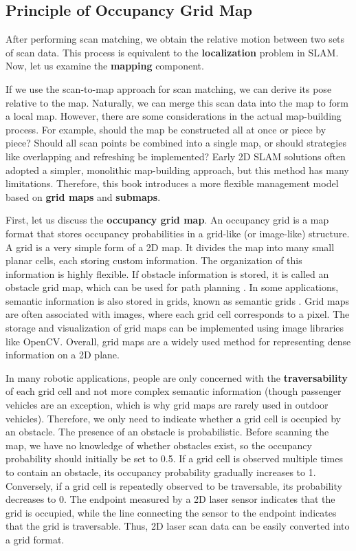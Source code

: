 \subsection{Principle of Occupancy Grid Map}  
After performing scan matching, we obtain the relative motion between two sets of scan data. This process is equivalent to the \textbf{localization} problem in SLAM. Now, let us examine the \textbf{mapping} component.  

If we use the scan-to-map approach for scan matching, we can derive its pose relative to the map. Naturally, we can merge this scan data into the map to form a local map. However, there are some considerations in the actual map-building process. For example, should the map be constructed all at once or piece by piece? Should all scan points be combined into a single map, or should strategies like overlapping and refreshing be implemented? Early 2D SLAM solutions often adopted a simpler, monolithic map-building approach, but this method has many limitations. Therefore, this book introduces a more flexible management model based on \textbf{grid maps} and \textbf{submaps}.  

First, let us discuss the \textbf{occupancy grid map}. An occupancy grid is a map format that stores occupancy probabilities in a grid-like (or image-like) structure. A grid is a very simple form of a 2D map. It divides the map into many small planar cells, each storing custom information. The organization of this information is highly flexible. If obstacle information is stored, it is called an obstacle grid map, which can be used for path planning \cite{Tsardoulias2016}. In some applications, semantic information is also stored in grids, known as semantic grids \cite{Qi2020}. Grid maps are often associated with images, where each grid cell corresponds to a pixel. The storage and visualization of grid maps can be implemented using image libraries like OpenCV. Overall, grid maps are a widely used method for representing dense information on a 2D plane.  

In many robotic applications, people are only concerned with the \textbf{traversability} of each grid cell and not more complex semantic information (though passenger vehicles are an exception, which is why grid maps are rarely used in outdoor vehicles). Therefore, we only need to indicate whether a grid cell is occupied by an obstacle. The presence of an obstacle is probabilistic. Before scanning the map, we have no knowledge of whether obstacles exist, so the occupancy probability should initially be set to 0.5. If a grid cell is observed multiple times to contain an obstacle, its occupancy probability gradually increases to 1. Conversely, if a grid cell is repeatedly observed to be traversable, its probability decreases to 0. The endpoint measured by a 2D laser sensor indicates that the grid is occupied, while the line connecting the sensor to the endpoint indicates that the grid is traversable. Thus, 2D laser scan data can be easily converted into a grid format.  


